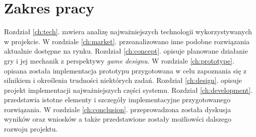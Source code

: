 \section*{Zakres pracy}
Rozdział \ref{ch:tech}. zawiera analizę najważniejszych technologii wykorzystywanych w projekcie. W rozdziale \ref{ch:market}. przeanalizowano inne podobne rozwiązania aktualnie dostępne na rynku. Rozdział \ref{ch:concept}. opisuje planowane działanie gry i jej mechanik z perspektywy \emph{game designu}. W rozdziale \ref{ch:prototype}. opisana została implementacja prototypu przygotowana w celu zapoznania się z silnikiem i określenia trudności niektórych zadań. Rozdział \ref{ch:design}. opisuje projekt implementacji najważniejszych części systemu. Rozdział \ref{ch:development}. przedstawia istotne elementy i szczegóły implementacyjne przygotowanego rozwiązania. W rozdziale \ref{ch:conclusion}. przeprowadzona została dyskusja wyników oraz wniosków a także przedstawione zostały możliowści dalszego rozwoju projektu.